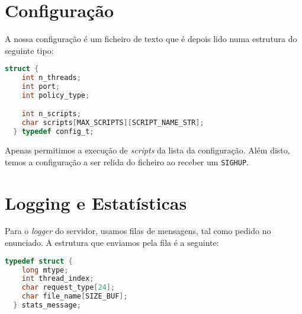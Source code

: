 \documentclass[12pt]{article}
\begin{document}
\section{Configuração}
A nossa configuração é um ficheiro de texto que é depois lido numa estrutura
do seguinte tipo:

\vspace{2mm}
\begin{lstlisting}[language=C]
  struct {
    int n_threads;
    int port;
    int policy_type;

    int n_scripts;
    char scripts[MAX_SCRIPTS][SCRIPT_NAME_STR];
  } typedef config_t;
\end{lstlisting}

Apenas permitimos a execução de \textit{scripts} da lista da configuração. Além disto,
temos a configuração a ser relida do ficheiro ao receber um \texttt{SIGHUP}.

\section{Logging e Estatísticas}
Para o \textit{logger} do servidor, usamos filas de mensagens, tal como pedido
no enunciado. A estrutura que enviamos pela fila é a seguinte:

\vspace{2mm}
\begin{lstlisting}[language=C]
  typedef struct {
    long mtype;
    int thread_index;
    char request_type[24];
    char file_name[SIZE_BUF];
  } stats_message;
\end{lstlisting}
\end{document}
